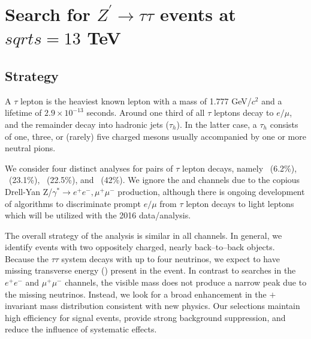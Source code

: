 \chapter{Search for $Z^{\prime}\to\tau\tau$ events at $sqrt{s} = 13$ TeV}

\section{Strategy}\label{sec:strategy}
A $\tau$ lepton is the heaviest known lepton with a mass of 1.777 GeV/$c^2$ and a lifetime of $2.9\times10^{-13}$ seconds. Around one third of
all $\tau$ leptons decay to $e/\mu$, and the remainder decay into hadronic jets ($\tau_{h}$). 
In the latter case, a $\tau_{h}$ consists of one, three, or (rarely) five charged mesons usually accompanied by one or
more neutral pions.

We consider four distinct analyses for pairs of $\tau$ lepton decays, namely \emu ~(6.2\%), \etau ~(23.1\%), \mutau  ~(22.5\%), and
\ditauhad ~(42\%). We ignore the \EE and \MM channels due to the copious Drell-Yan
Z/$\gamma^*\rightarrow e^+e^-, \mu^+\mu^-$ production, although there is ongoing development of algorithms to discriminate prompt $e/\mu$ from $\tau$ lepton 
decays to light leptons which will be utilized with the 2016 data/analysis.

The overall strategy of the analysis is similar in all channels. 
In general, we identify events with two oppositely charged, nearly back--to--back objects. Because the $\tau\tau$ system decays with up
to four neutrinos, we expect to have missing transverse energy (\MET) present in the event. In contrast to \zprime searches in the
$e^+e^-$ and $\mu^+\mu^-$ channels, the visible \ditau mass does not produce a narrow peak due to the missing neutrinos.
Instead, we look for a broad enhancement in the \ditau$+$\MET invariant mass distribution consistent with new physics.  Our
selections maintain high efficiency for signal events, provide strong background suppression, and reduce the influence of systematic
effects.  

